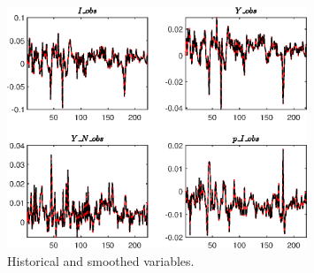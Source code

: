  
\begin{figure}[H]
\centering 
\includegraphics[width=0.80\textwidth]{RBC_growth/graphs/RBC_growth_HistoricalAndSmoothedVariables1}
\caption{Historical and smoothed variables.}\label{Fig:HistoricalAndSmoothedVariables:1}
\end{figure}


